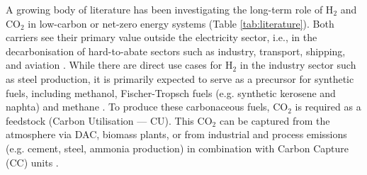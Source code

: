 \documentclass[pdflatex,sn-nature]{sn-jnl}%
\theoremstyle{thmstyleone}%
\theoremstyle{thmstyletwo}%
\theoremstyle{thmstylethree}%
\begin{document}
A growing body of literature has been investigating the long-term role of H$_2$ and CO$_2$ in low-carbon or net-zero energy systems (Table \ref{tab:literature}). Both carriers see their primary value outside the electricity sector, i.e., in the decarbonisation of hard-to-abate sectors such as industry, transport, shipping, and aviation \cite{reigstadMovingLowcarbonHydrogen2022,vangreevenbroekLittleLoseCase2025}. While there are direct use cases for H$_2$ in the industry sector such as steel production, it is primarily expected to serve as a precursor for synthetic fuels, including methanol, Fischer-Tropsch fuels (e.g. synthetic kerosene and naphta) and methane \cite{neumannNearoptimalFeasibleSpace2021,neumannPotentialRoleHydrogen2023,neumannGreenEnergySteel2025,kountourisUnifiedEuropeanHydrogen2024,beresWillHydrogenSynthetic2024,fleiterHydrogenInfrastructureFuture2025}. To produce these carbonaceous fuels, CO$_2$ is required as a feedstock (Carbon Utilisation --- CU). This CO$_2$ can be captured from the atmosphere via DAC, biomass plants, or from industrial and process emissions (e.g. cement, steel, ammonia production) in combination with Carbon Capture (CC) units \cite{hofmannH2CO2Network2025,bakkenLinearModelsOptimization2008}.
\end{document}
